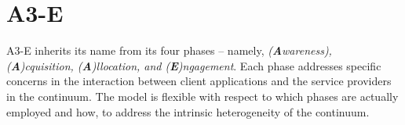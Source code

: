 






\section{A3-E}\label{sec:A3-E}

A3-E inherits its name from its four phases -- namely, \textit{(\textbf{A}wareness), (\textbf{A})cquisition, (\textbf{A})llocation, and (\textbf{E})ngagement}. Each phase addresses specific concerns in the interaction between client applications and the service providers in the continuum. The model is flexible with respect to which phases are actually employed and how, to address the intrinsic heterogeneity of the continuum. 

